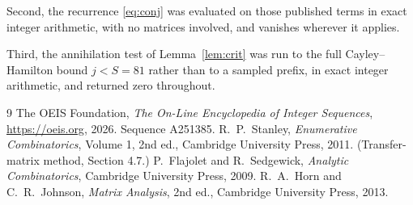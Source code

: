 \documentclass[11pt,a4paper]{article}
\theoremstyle{plain}
\theoremstyle{definition}
\begin{document}
Second, the recurrence \eqref{eq:conj} was evaluated on those published terms in exact
integer arithmetic, with no matrices involved, and vanishes wherever it applies.

Third, the annihilation test of Lemma~\ref{lem:crit} was run to the full Cayley--Hamilton
bound $j<S=81$ rather than to a sampled prefix, in exact integer arithmetic, and returned
zero throughout.

\begin{thebibliography}{9}
 The OEIS Foundation, \emph{The On-Line Encyclopedia of Integer
Sequences}, \url{https://oeis.org}, 2026. Sequence A251385.
 R.~P.~Stanley, \emph{Enumerative Combinatorics}, Volume 1, 2nd ed.,
Cambridge University Press, 2011. (Transfer-matrix method, Section 4.7.)
 P.~Flajolet and R.~Sedgewick, \emph{Analytic Combinatorics}, Cambridge
University Press, 2009.
 R.~A.~Horn and C.~R.~Johnson, \emph{Matrix Analysis}, 2nd ed., Cambridge
University Press, 2013.
\end{thebibliography}
\end{document}
